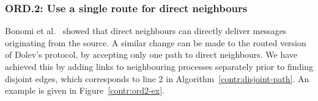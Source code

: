 
\subsubsection{ORD.2: Use a single route for direct neighbours}
Bonomi et al.~\cite{bonomi2019multihop} showed that direct neighbours can directly deliver messages originating from the source. A similar change can be made to the routed version of Dolev's protocol, by accepting only one path to direct neighbours. We have achieved this by adding links to neighbouring processes separately prior to finding disjoint edges, which corresponds to line 2 in Algorithm~\ref{contr:disjoint-path}. An example is given in Figure~\ref{contr:ord2-ex}.


